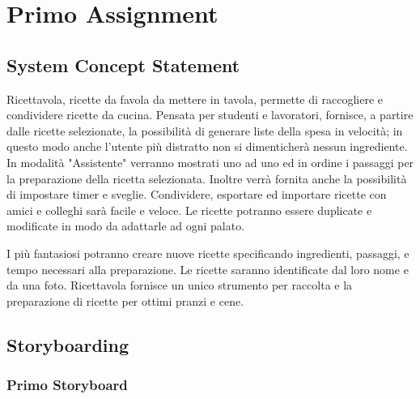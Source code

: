 

\section{Primo Assignment}



\subsection{System Concept Statement}

Ricettavola, ricette da favola da mettere in tavola, permette di raccogliere e condividere ricette da cucina.
Pensata per studenti e lavoratori, fornisce, a partire dalle ricette selezionate, la possibilità di generare liste della spesa in velocità;
in questo modo anche l'utente più distratto non si dimenticherà nessun ingrediente.
In modalità "Assistente" verranno mostrati uno ad uno ed in ordine i passaggi per la preparazione della ricetta selezionata.
Inoltre verrà fornita anche la possibilità di impostare timer e sveglie.
Condividere, esportare ed importare ricette con amici e colleghi sarà facile e veloce.
Le ricette potranno essere duplicate e modificate in modo da adattarle ad ogni palato.

I più fantasiosi potranno creare nuove ricette specificando ingredienti, passaggi, e tempo necessari alla preparazione.
Le ricette saranno identificate dal loro nome e da una foto.
Ricettavola fornisce un unico strumento per raccolta e la preparazione di ricette per ottimi pranzi e cene.







\subsection{Storyboarding}
\subsubsection{Primo Storyboard}


